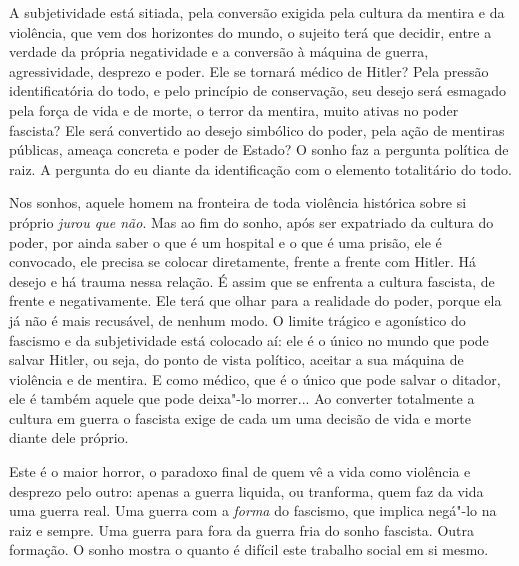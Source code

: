 A subjetividade está sitiada, pela conversão exigida pela cultura da
mentira e da violência, que vem dos horizontes do mundo, o sujeito terá
que decidir, entre a verdade da própria negatividade e a conversão à
máquina de guerra, agressividade, desprezo e poder. Ele se tornará
médico de Hitler? Pela pressão identificatória do todo, e pelo princípio
de conservação, seu desejo será esmagado pela força de vida e de morte,
o terror da mentira, muito ativas no poder fascista? Ele será convertido
ao desejo simbólico do poder, pela ação de mentiras públicas, ameaça
concreta e poder de Estado? O sonho faz a pergunta política de raiz. A
pergunta do eu diante da identificação com o elemento totalitário do
todo.

Nos sonhos, aquele homem na fronteira de toda violência histórica sobre
si próprio \emph{jurou que não}. Mas ao fim do sonho, após ser
expatriado da cultura do poder, por ainda saber o que é um hospital e o
que é uma prisão, ele é convocado, ele precisa se colocar diretamente,
frente a frente com Hitler. Há desejo e há trauma nessa relação. É assim
que se enfrenta a cultura fascista, de frente e negativamente. Ele terá
que olhar para a realidade do poder, porque ela já não é mais recusável,
de nenhum modo. O limite trágico e agonístico do fascismo e da
subjetividade está colocado aí: ele é o único no mundo que pode salvar
Hitler, ou seja, do ponto de vista político, aceitar a sua máquina de
violência e de mentira. E como médico, que é o único que pode salvar o
ditador, ele é também aquele que pode deixa"-lo morrer... Ao converter
totalmente a cultura em guerra o fascista exige de cada um uma decisão
de vida e morte diante dele próprio.

Este é o maior horror, o paradoxo final de quem vê a vida como violência
e desprezo pelo outro: apenas a guerra liquida, ou tranforma, quem faz
da vida uma guerra real. Uma guerra com a \emph{forma} do fascismo, que
implica negá"-lo na raiz e sempre. Uma guerra para fora da guerra fria do
sonho fascista. Outra formação. O sonho mostra o quanto é difícil este
trabalho social em si mesmo.

